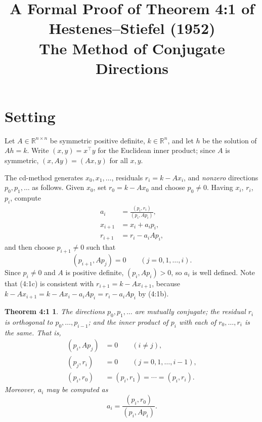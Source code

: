 \documentclass[11pt]{article}
\title{A Formal Proof of Theorem 4:1 of Hestenes--Stiefel (1952)\\
\large The Method of Conjugate Directions}
\date{}
\newtheorem*{theorem}{Theorem 4:1}
\begin{document}
\maketitle

\section*{Setting}

Let $A \in \mathbb{R}^{n\times n}$ be symmetric positive definite, $k \in \mathbb{R}^n$,
and let $h$ be the solution of $Ah = k$. Write $(x,y) = x^{\top}y$ for the Euclidean
inner product; since $A$ is symmetric, $(x, Ay) = (Ax, y)$ for all $x,y$.

The cd-method generates $x_0, x_1, \dots$, residuals $r_i = k - Ax_i$, and
\emph{nonzero} directions $p_0, p_1, \dots$ as follows. Given $x_0$, set
$r_0 = k - Ax_0$ and choose $p_0 \neq 0$. Having $x_i$, $r_i$, $p_i$, compute
\begin{align}
a_i &= \frac{(p_i, r_i)}{(p_i, Ap_i)}, \tag{4:1a}\\
x_{i+1} &= x_i + a_i p_i, \tag{4:1b}\\
r_{i+1} &= r_i - a_i A p_i, \tag{4:1c}
\end{align}
and then choose $p_{i+1} \neq 0$ such that
\begin{equation}
(p_{i+1}, A p_j) = 0 \qquad (j = 0, 1, \dots, i). \tag{4:2}
\end{equation}
Since $p_i \neq 0$ and $A$ is positive definite, $(p_i, Ap_i) > 0$, so $a_i$ is well defined.
Note that (4:1c) is consistent with $r_{i+1} = k - Ax_{i+1}$, because
$k - Ax_{i+1} = k - Ax_i - a_iAp_i = r_i - a_iAp_i$ by (4:1b).

\begin{theorem}
The directions $p_0, p_1, \dots$ are mutually conjugate; the residual $r_i$ is
orthogonal to $p_0, \dots, p_{i-1}$; and the inner product of $p_i$ with each of
$r_0, \dots, r_i$ is the same. That is,
\begin{align}
(p_i, Ap_j) &= 0 \qquad (i \neq j), \tag{4:3a}\\
(p_j, r_i) &= 0 \qquad (j = 0, 1, \dots, i-1), \tag{4:3b}\\
(p_i, r_0) &= (p_i, r_1) = \cdots = (p_i, r_i). \tag{4:3c}
\end{align}
Moreover, $a_i$ may be computed as
\begin{equation}
a_i = \frac{(p_i, r_0)}{(p_i, Ap_i)}. \tag{4:4}
\end{equation}
\end{theorem}
\end{document}
